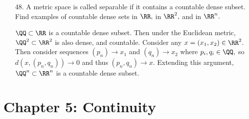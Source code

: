 \documentclass{article}
\begin{document}
\begin{itemize}
\begin{enumerate}[(a)]
\begin{proof}
					$(\supset):$ If $x\in\overline{A},$ then since $M$ is closed in $M,$ we have $\overline{A}\subset M,$ so $x\in M.$ Since $(A^c)^\circ \subset A^c\subset M,$ it follows that if $x\in (A^c)^\circ,$ it must be that $x\in M.$

					$(\subset):$ Suppose $x\in M$ but $x\notin \overline{A}$ and $x\notin (A^c)^\circ.$ Since $x\notin (A^c)^\circ,$ we have $B_{\varepsilon}(x)\not\subset A^c\implies B_\varepsilon(x)\cap A\neq\varnothing$ for all $\varepsilon>0.$ Since $x\notin \overline{A},$ there exists some $\delta>0$ such that $B_\delta(x)\cap A=\varnothing.$ Contradiction, so $x\in \overline{A}\cup (A^c)^\circ.$
				\end{proof}
				
		\end{enumerate}

	\item[48.] A metric space is called separable if it contains a countable dense subset. Find examples of countable dense sets in $\RR,$ in $\RR^2,$ and in $\RR^n.$
		\begin{soln}
			$\QQ\subset\RR$ is a countable dense subset. Then under the Euclidean metric, $\QQ^2\subset\RR^2$ is also dense, and countable. Consider any $x=(x_1, x_2)\in\RR^2.$ Then consider sequences $(p_n)\to x_1$ and $(q_n)\to x_2$ where $p_i, q_i\in\QQ,$ so $d(x, (p_n, q_n))\to 0$ and thus $(p_n, q_n)\to x.$ Extending this argument, $\QQ^n\subset \RR^n$ is a countable dense subset.
		\end{soln}
		
\end{itemize}

\section*{Chapter 5: Continuity}
\end{document}
